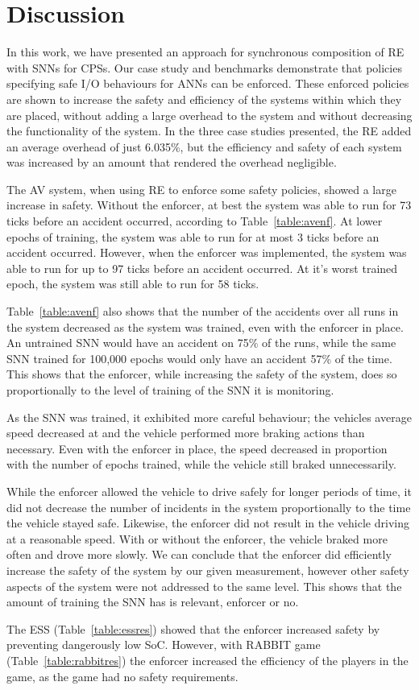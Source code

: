 \section{Discussion}
\label{sec:conclusion}

In this work, we have presented an approach for synchronous composition of \acf{RE} with \acfp{SNN} for \acp{CPS}.
Our case study and benchmarks demonstrate that policies specifying safe I/O behaviours for \acp{ANN} can be enforced.
These enforced policies are shown to increase the safety and efficiency of the systems within which they are placed, without adding a large overhead to the system and without decreasing the functionality of the system.
In the three case studies presented, the \ac{RE} added an average overhead of just 6.035\%, but the efficiency and safety of each system was increased by an amount that rendered the overhead negligible.

The \ac{AV} system, when using \ac{RE} to enforce some safety policies, showed a large increase in safety.
Without the enforcer, at best the system was able to run for 73 ticks before an accident occurred, according to Table~\ref{table:avenf}.
At lower epochs of training, the system was able to run for at most 3 ticks before an accident occurred.
However, when the enforcer was implemented, the system was able to run for up to 97 ticks before an accident occurred.
At it's worst trained epoch, the system was still able to run for 58 ticks.

Table~\ref{table:avenf} also shows that the number of the accidents over all runs in the system decreased as the system was trained, even with the enforcer in place.
An untrained \ac{SNN} would have an accident on 75\% of the runs, while the same \ac{SNN} trained for 100,000 epochs would only have an accident 57\% of the time.
This shows that the enforcer, while increasing the safety of the system, does so proportionally to the level of training of the \ac{SNN} it is monitoring.

As the \ac{SNN} was trained, it exhibited more careful behaviour; the vehicles average speed decreased at and the vehicle performed more braking actions than necessary.
Even with the enforcer in place, the speed decreased in proportion with the number of epochs trained, while the vehicle still braked unnecessarily.

While the enforcer allowed the vehicle to drive safely for longer periods of time, it did not decrease the number of incidents in the system proportionally to the time the vehicle stayed safe.
Likewise, the enforcer did not result in the vehicle driving at a reasonable speed.
With or without the enforcer, the vehicle braked more often and drove more slowly.
We can conclude that the enforcer did efficiently increase the safety of the system by our given measurement, however other safety aspects of the system were not addressed to the same level.
This shows that the amount of training the \ac{SNN} has is relevant, enforcer or no.

The \ac{ESS} (Table~\ref{table:essres}) showed that the enforcer increased safety by preventing dangerously low \acf{SoC}.
However, with RABBIT game (Table~\ref{table:rabbitres}) the enforcer increased the efficiency of the players in the game, as the game had no safety requirements.










